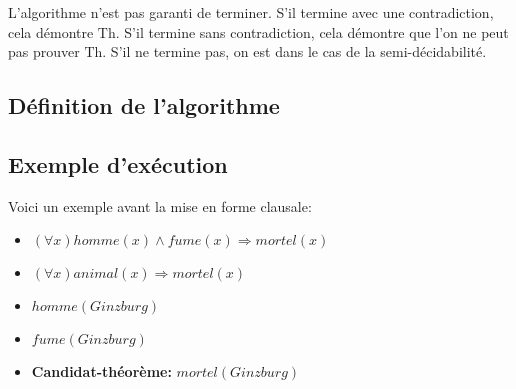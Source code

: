 {L'algorithme n'est pas garanti de terminer.
S'il termine avec une contradiction, cela démontre $\mathrm{Th}$.
S'il termine sans contradiction, cela démontre que l'on ne peut pas prouver $\mathrm{Th}$.
S'il ne termine pas, on est dans le cas de la semi-décidabilité.

\subsection{Définition de l'algorithme}

\begin{algorithm}
\end{algorithm}

\subsection{Exemple d'exécution}
Voici un exemple avant la mise en forme clausale:
\begin{itemize}
  \item $(\forall x) \mathit{homme}(x) \wedge \mathit{fume}(x) \Rightarrow \mathit{mortel}(x)$
  \item $(\forall x) \mathit{animal}(x) \Rightarrow \mathit{mortel}(x)$
  \item $\mathit{homme}(\mathit{Ginzburg})$
  \item $\mathit{fume}(\mathit{Ginzburg})$
  \item \textbf{Candidat-théorème:} $\mathit{mortel}(\mathit{Ginzburg})$
\end{itemize}

}
